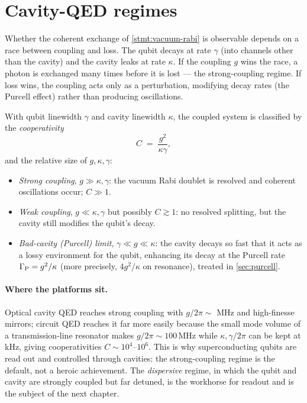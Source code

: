 \section{Cavity-QED regimes}
\label{sec:cqed-regimes}

\begin{phenomenon}
Whether the coherent exchange of \cref{stmt:vacuum-rabi} is
observable depends on a race between coupling and loss. The qubit
decays at rate $\gamma$ (into channels other than the cavity) and
the cavity leaks at rate $\kappa$. If the coupling $g$ wins the
race, a photon is exchanged many times before it is lost --- the
strong-coupling regime. If loss wins, the coupling acts only as a
perturbation, modifying decay rates (the Purcell effect) rather than
producing oscillations.
\end{phenomenon}

\begin{statement}
\label{stmt:cqed-regimes}
With qubit linewidth $\gamma$ and cavity linewidth $\kappa$, the
coupled system is classified by the \emph{cooperativity}
\begin{equation}
\label{eq:cooperativity}
C \;=\; \frac{g^2}{\kappa\gamma},
\end{equation}
and the relative size of $g,\kappa,\gamma$:
\begin{itemize}
  \item \emph{Strong coupling}, $g\gg\kappa,\gamma$: the vacuum Rabi
        doublet is resolved and coherent oscillations occur; $C\gg1$.
  \item \emph{Weak coupling}, $g\ll\kappa,\gamma$ but possibly
        $C\gtrsim1$: no resolved splitting, but the cavity still
        modifies the qubit's decay.
  \item \emph{Bad-cavity (Purcell) limit}, $\gamma\ll g\ll\kappa$:
        the cavity decays so fast that it acts as a lossy
        environment for the qubit, enhancing its decay at the
        Purcell rate $\Gamma_{\rm P}=g^2/\kappa$ (more precisely,
        $4g^2/\kappa$ on resonance), treated in \cref{sec:purcell}.
\end{itemize}
\end{statement}

\paragraph{Where the platforms sit.}
Optical cavity QED reaches strong coupling with $g/2\pi\sim$ MHz and
high-finesse mirrors; circuit QED reaches it far more easily because
the small mode volume of a transmission-line resonator makes
$g/2\pi\sim 100\,$MHz while $\kappa,\gamma/2\pi$ can be kept at kHz,
giving cooperativities $C\sim10^4$--$10^6$. This is why
superconducting qubits are read out and controlled through cavities:
the strong-coupling regime is the default, not a heroic achievement.
The \emph{dispersive} regime, in which the qubit and cavity are
strongly coupled but far detuned, is the workhorse for readout and
is the subject of the next chapter.

